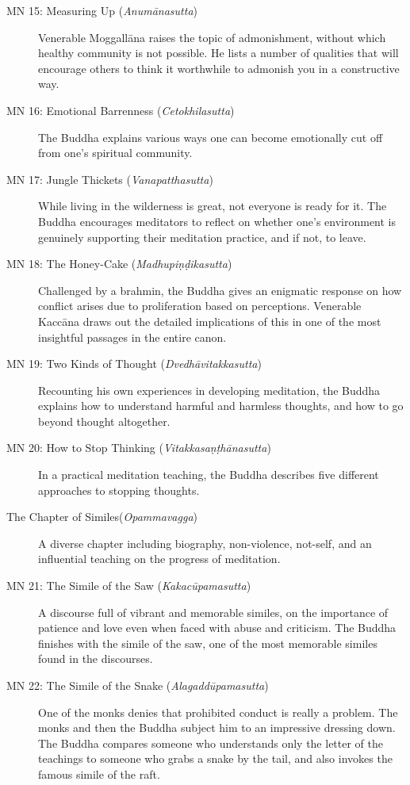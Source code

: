 \documentclass[12pt,openany]{book}%
\begin{document}
\begin{description}
\item[MN 15: Measuring Up (\textit{\textsanskrit{Anumānasutta}})] Venerable \textsanskrit{Moggallāna} raises the topic of admonishment, without which healthy community is not possible. He lists a number of qualities that will encourage others to think it worthwhile to admonish you in a constructive way.%
\item[MN 16: Emotional Barrenness (\textit{\textsanskrit{Cetokhilasutta}})] The Buddha explains various ways one can become emotionally cut off from one’s spiritual community.%
\item[MN 17: Jungle Thickets (\textit{\textsanskrit{Vanapatthasutta}})] While living in the wilderness is great, not everyone is ready for it. The Buddha encourages meditators to reflect on whether one’s environment is genuinely supporting their meditation practice, and if not, to leave.%
\item[MN 18: The Honey-Cake (\textit{\textsanskrit{Madhupiṇḍikasutta}})] Challenged by a brahmin, the Buddha gives an enigmatic response on how conflict arises due to proliferation based on perceptions. Venerable \textsanskrit{Kaccāna} draws out the detailed implications of this in one of the most insightful passages in the entire canon.%
\item[MN 19: Two Kinds of Thought (\textit{\textsanskrit{Dvedhāvitakkasutta}})] Recounting his own experiences in developing meditation, the Buddha explains how to understand harmful and harmless thoughts, and how to go beyond thought altogether.%
\item[MN 20: How to Stop Thinking (\textit{\textsanskrit{Vitakkasaṇṭhānasutta}})] In a practical meditation teaching, the Buddha describes five different approaches to stopping thoughts.%
\item[The Chapter of Similes(\textit{\textsanskrit{Opammavagga}})] A diverse chapter including biography, non-violence, not-self, and an influential teaching on the progress of meditation.%
\item[MN 21: The Simile of the Saw (\textit{\textsanskrit{Kakacūpamasutta}})] A discourse full of vibrant and memorable similes, on the importance of patience and love even when faced with abuse and criticism. The Buddha finishes with the simile of the saw, one of the most memorable similes found in the discourses.%
\item[MN 22: The Simile of the Snake (\textit{\textsanskrit{Alagaddūpamasutta}})] One of the monks denies that prohibited conduct is really a problem. The monks and then the Buddha subject him to an impressive dressing down. The Buddha compares someone who understands only the letter of the teachings to someone who grabs a snake by the tail, and also invokes the famous simile of the raft.%

\end{description}
\end{document}
